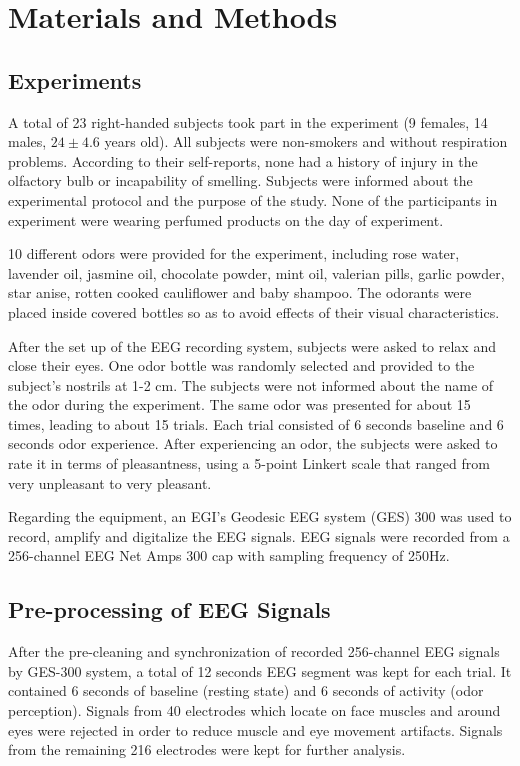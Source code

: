 \section{Materials and Methods}

\subsection{Experiments}
A total of 23 right-handed subjects took part in the experiment (9 females, 14 males, $24 \pm 4.6$ years old). All subjects were non-smokers and without respiration problems. According to their self-reports, none had a history of injury in the olfactory bulb or incapability of smelling. Subjects were informed about the experimental protocol and the purpose of the study. None of the participants in experiment were wearing perfumed products on the day of experiment. 

10 different odors were provided for the experiment, including rose water, lavender oil, jasmine oil, chocolate powder, mint oil, valerian pills, garlic powder, star anise, rotten cooked cauliflower and baby shampoo. The odorants were placed inside covered bottles so as to avoid effects of their visual characteristics.

After the set up of the EEG recording system, subjects were asked to relax and close their eyes. One odor bottle was randomly selected and provided to the subject's nostrils at 1-2 cm. The subjects were not informed about the name of the odor during the experiment. The same odor was presented for about 15 times, leading to about 15 trials. Each trial consisted of 6 seconds baseline and 6 seconds odor experience. After experiencing an odor, the subjects were asked to rate it in terms of pleasantness, using a 5-point Linkert scale that ranged from very unpleasant to very pleasant. 

Regarding the equipment, an EGI's Geodesic EEG system (GES) 300 was used to record, amplify and digitalize the EEG signals. EEG signals were recorded from a 256-channel EEG Net Amps 300 cap with sampling frequency of 250Hz.  

\subsection{Pre-processing of EEG Signals}
After the pre-cleaning and synchronization of recorded 256-channel EEG signals by GES-300 system, a total of 12 seconds EEG segment was kept for each trial. It contained 6 seconds of baseline (resting state) and 6 seconds of activity (odor perception). Signals from 40 electrodes which locate on face muscles and around eyes were rejected in order to reduce muscle and eye movement artifacts. Signals from the remaining 216 electrodes were kept for further analysis. 

